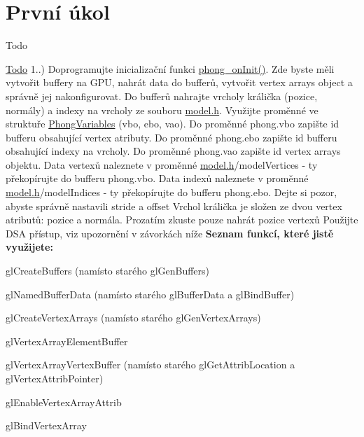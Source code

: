 \hypertarget{group__task1}{}\section{První úkol}
\label{group__task1}
\begin{DoxyRefDesc}{Todo}
\item[\hyperlink{todo__todo000004}{Todo}]1..) Doprogramujte inicializační funkci \hyperlink{student_8h_ac2adb2ba4e748239b9db4d037584d3cc}{phong\+\_\+on\+Init()}. Zde byste měli vytvořit buffery na G\+P\+U, nahrát data do bufferů, vytvořit vertex arrays object a správně jej nakonfigurovat. Do bufferů nahrajte vrcholy králička (pozice, normály) a indexy na vrcholy ze souboru \hyperlink{model_8h}{model.\+h}. Využijte proměnné ve struktuře \hyperlink{structPhongVariables}{Phong\+Variables} (vbo, ebo, vao). Do proměnné phong.\+vbo zapište id bufferu obsahující vertex atributy. Do proměnné phong.\+ebo zapište id bufferu obsahující indexy na vrcholy. Do proměnné phong.\+vao zapište id vertex arrays objektu. Data vertexů naleznete v proměnné \hyperlink{model_8h}{model.\+h}/model\+Vertices -\/ ty překopírujte do bufferu phong.\+vbo. Data indexů naleznete v proměnné \hyperlink{model_8h}{model.\+h}/model\+Indices -\/ ty překopírujte do bufferu phong.\+ebo. Dejte si pozor, abyste správně nastavili stride a offset Vrchol králička je složen ze dvou vertex atributů\+: pozice a normála. Prozatím zkuste pouze nahrát pozice vertexů Použijte D\+S\+A přístup, viz upozornění v závorkách níže {\bfseries Seznam funkcí, které jistě využijete\+:}
\begin{DoxyItemize}
\item gl\+Create\+Buffers (namísto starého gl\+Gen\+Buffers)
\item gl\+Named\+Buffer\+Data (namísto starého gl\+Buffer\+Data a gl\+Bind\+Buffer)
\item gl\+Create\+Vertex\+Arrays (namísto starého gl\+Gen\+Vertex\+Arrays)
\item gl\+Vertex\+Array\+Element\+Buffer
\item gl\+Vertex\+Array\+Vertex\+Buffer (namísto starého gl\+Get\+Attrib\+Location a gl\+Vertex\+Attrib\+Pointer)
\item gl\+Enable\+Vertex\+Array\+Attrib
\item gl\+Bind\+Vertex\+Array 
\end{DoxyItemize}\end{DoxyRefDesc}


